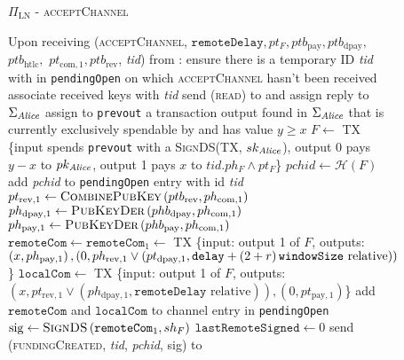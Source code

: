   \begin{figure}[H]
    \begin{protocolbox}{$\Pi_{\mathrm{LN}}$ - \textsc{acceptChannel}}
      \begin{algorithmic}[1]
        \State Upon receiving (\textsc{acceptChannel}, $\mathtt{remoteDelay},
        pt_F, ptb_{\mathrm{pay}}, ptb_{\mathrm{dpay}},$ $ptb_{\mathrm{htlc}},$
        $pt_{\mathrm{com}, 1}, ptb_{\mathrm{rev}}$, \textit{tid}) from \bob:
        \Indent
          \State ensure there is a temporary ID \textit{tid} with \bob{} in
          \texttt{pendingOpen} on which \textsc{acceptChannel} hasn't been
          received
          \State associate received keys with \textit{tid}
          \State send (\textsc{read}) to \ledger{} and assign reply to
          $\Sigma_{\mathit{Alice}}$
          \State assign to \texttt{prevout} a transaction output found in
          $\Sigma_{\mathit{Alice}}$ that is currently exclusively spendable by \alice{}
          and has value $y \geq x$
          \State $F \gets$ TX \{input spends \texttt{prevout} with a
          \textsc{SignDS}(TX, $sk_{\mathit{Alice}}$), output 0 pays $y - x$ to
          $pk_{\mathit{Alice}}$, output 1 pays $x$ to $\mathit{tid}.ph_F \wedge pt_F$\}
          \State $\mathit{pchid} \gets \mathcal{H}\left(F\right)$
          \State add \textit{pchid} to \texttt{pendingOpen} entry with id
          \textit{tid}
          \State $pt_{\mathrm{rev}, 1} \gets
          \textsc{CombinePubKey}\left(ptb_{\mathrm{rev}}, ph_{\mathrm{com},
          1}\right)$
          \State $ph_{\mathrm{dpay}, 1} \gets
          \textsc{PubKeyDer}\left(phb_{\mathrm{dpay}}, ph_{\mathrm{com},
          1}\right)$
          \State $ph_{\mathrm{pay}, 1} \gets
          \textsc{PubKeyDer}\left(phb_{\mathrm{pay}}, ph_{\mathrm{com},
          1}\right)$
          \State $\mathtt{remoteCom} \gets \mathtt{remoteCom}_1 \gets$ TX
          \{input: output 1 of $F$, outputs: $\left(x, ph_{\mathrm{pay},
          1}\right), \left(0, ph_{\mathrm{rev}, 1} \vee \left(pt_{\mathrm{dpay},
          1}, \mathtt{delay} + \left(2 + r\right)\texttt{windowSize}{} \text{ relative}\right)\right)$\}
          \State $\mathtt{localCom} \gets$ TX \{input: output 1 of $F$, outputs:
          $\left(x, pt_{\mathrm{rev}, 1} \vee \left(ph_{\mathrm{dpay}, 1},
          \mathtt{remoteDelay} \text{ relative}\right)\right), \left(0,
          pt_{\mathrm{pay}, 1}\right)$\}
          \State add $\mathtt{remoteCom}$ and $\mathtt{localCom}$ to channel
          entry in \texttt{pendingOpen}
          \State $\mathrm{sig} \gets \textsc{SignDS}\left(\mathtt{remoteCom}_1,
          sh_F\right)$
          \State $\mathtt{lastRemoteSigned} \gets 0$
          \State send (\textsc{fundingCreated}, \textit{tid},
          \textit{pchid}, sig) to \bob{}
        \EndIndent
      \end{algorithmic}
    \end{protocolbox}
    \caption{}
    \label{alg:protocol:open:acceptChannel}
  \end{figure}

